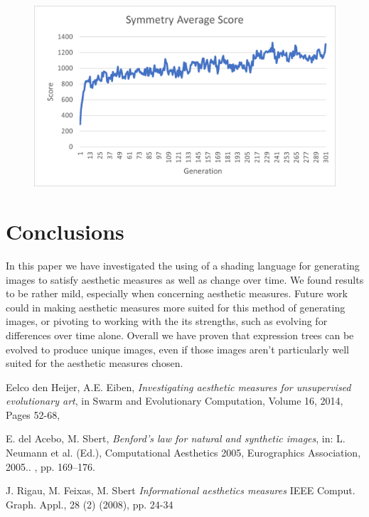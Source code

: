 \documentclass{acmart}
\begin{document}
\begin{figure}[h!]
    \includegraphics[width =\textwidth]{Symmetry_AvgScoreGen.png}
\end{figure}

\section*{Conclusions}
In this paper we have investigated the using of a shading language for generating images to satisfy aesthetic measures as well as change over time. We found results to be rather mild, 
especially when concerning aesthetic measures. Future work could in making aesthetic measures more suited for this method of generating images, or pivoting to working with the its strengths, such
as evolving for differences over time alone. Overall we have proven that expression trees can be evolved to produce unique images, even if those images aren't particularly well suited for 
the aesthetic measures chosen.

\begin{thebibliography}{9}

    Eelco den Heijer, A.E. Eiben,
    \textit{Investigating aesthetic measures for unsupervised evolutionary art}, in
    Swarm and Evolutionary Computation,
    Volume 16,
    2014,
    Pages 52-68,

    E. del Acebo, M. Sbert, \textit{Benford's law for natural and synthetic images}, in: 
    L. Neumann et al. (Ed.), Computational Aesthetics 2005, Eurographics Association, 2005.. 
    , pp. 169–176.
    
    J. Rigau, M. Feixas, M. Sbert
    \textit{Informational aesthetics measures}
    IEEE Comput. Graph. Appl., 28 (2) (2008), pp. 24-34

    \end{thebibliography}
\end{document}
